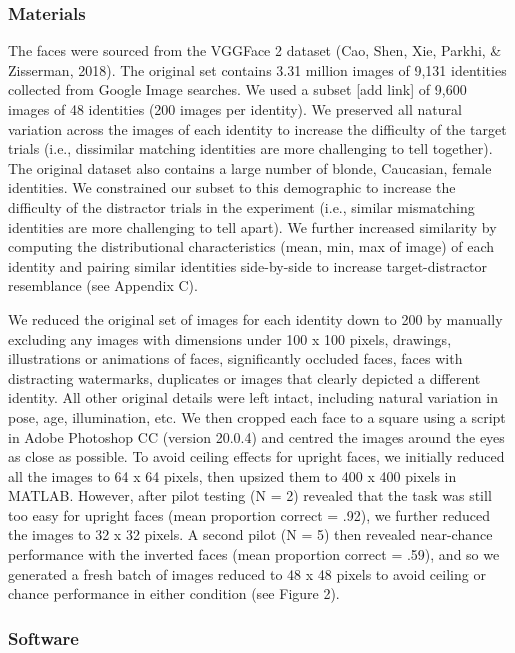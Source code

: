 \documentclass[
  english,
  man]{apa6}
\begin{document}
\hypertarget{materials}{%
\subsubsection{Materials}\label{materials}}

The faces were sourced from the VGGFace 2 dataset (Cao, Shen, Xie, Parkhi, \& Zisserman, 2018). The original set contains 3.31 million images of 9,131 identities collected from Google Image searches. We used a subset {[}add link{]} of 9,600 images of 48 identities (200 images per identity). We preserved all natural variation across the images of each identity to increase the difficulty of the target trials (i.e., dissimilar matching identities are more challenging to tell together). The original dataset also contains a large number of blonde, Caucasian, female identities. We constrained our subset to this demographic to increase the difficulty of the distractor trials in the experiment (i.e., similar mismatching identities are more challenging to tell apart). We further increased similarity by computing the distributional characteristics (mean, min, max of image) of each identity and pairing similar identities side-by-side to increase target-distractor resemblance (see Appendix C).

We reduced the original set of images for each identity down to 200 by manually excluding any images with dimensions under 100 x 100 pixels, drawings, illustrations or animations of faces, significantly occluded faces, faces with distracting watermarks, duplicates or images that clearly depicted a different identity. All other original details were left intact, including natural variation in pose, age, illumination, etc. We then cropped each face to a square using a script in Adobe Photoshop CC (version 20.0.4) and centred the images around the eyes as close as possible. To avoid ceiling effects for upright faces, we initially reduced all the images to 64 x 64 pixels, then upsized them to 400 x 400 pixels in MATLAB. However, after pilot testing (N = 2) revealed that the task was still too easy for upright faces (mean proportion correct = .92), we further reduced the images to 32 x 32 pixels. A second pilot (N = 5) then revealed near-chance performance with the inverted faces (mean proportion correct = .59), and so we generated a fresh batch of images reduced to 48 x 48 pixels to avoid ceiling or chance performance in either condition (see Figure 2).

\hypertarget{software}{%
\subsubsection{Software}\label{software}}
\end{document}
